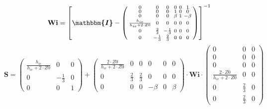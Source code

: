 \[ \mathbf{Wi} =  \left[ \boldsymbol{\mathbbm{I}}  -
\left(\begin{smallmatrix} 0 & 0 & 0 & 0 & 0 & 1 \\ 0 & 0 & 0 & 1 & 0 &
0 \\ 0 & 0 & 0 & \beta & 1 & -\beta \\ \frac{h_{ie}}{h_{ie}+2\cdot Z0}
& 0 & 0 & 0 & 0 & 0 \\ 0 & \frac{2}{3} & -\frac{1}{3} & 0 & 0 & 0 \\ 0
& -\frac{1}{3} & \frac{2}{3} & 0 & 0 & 0 \end{smallmatrix}\right)
\right]^{-1}  \]
\[ \mathbf{S} = \left(\begin{smallmatrix} \frac{h_{ie}}{h_{ie}+2\cdot
Z0} & 0 & 0 \\ 0 & -\frac{1}{3} & 0 \\ 0 & 0 & 1
\end{smallmatrix}\right) + \left(\begin{smallmatrix} \frac{2\cdot
Z0}{h_{ie}+2\cdot Z0} & 0 & 0 & 0 & 0 & 0 \\ 0 & \frac{2}{3} &
\frac{2}{3} & 0 & 0 & 0 \\ 0 & 0 & 0 & -\beta & 0 & \beta
\end{smallmatrix}\right) \cdot \mathbf{Wi}
\cdot\left(\begin{smallmatrix} 0 & 0 & 0 \\ 0 & 0 & 0 \\ 0 & 0 & 0 \\
\frac{2\cdot Z0}{h_{ie}+2\cdot Z0} & 0 & 0 \\ 0 & \frac{2}{3} & 0 \\ 0
& \frac{2}{3} & 0 \end{smallmatrix}\right) \]
